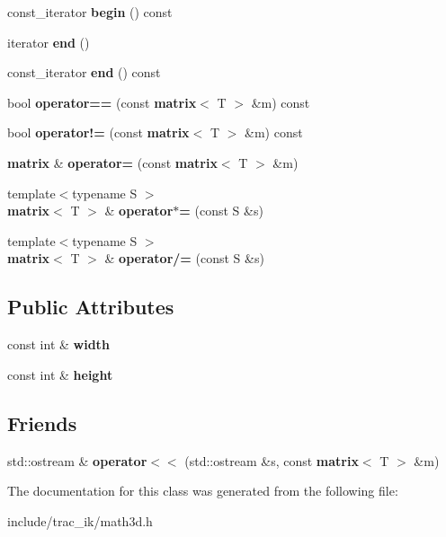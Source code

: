 \begin{DoxyCompactItemize}
\item 
const\-\_\-iterator {\bfseries begin} () const \label{classmath3d_1_1matrix_aa20581e4e4efc4295d15df554c97bb06}

\item 
iterator {\bfseries end} ()\label{classmath3d_1_1matrix_aabb29aaccf4c0b16e908f305b209b6f0}

\item 
const\-\_\-iterator {\bfseries end} () const \label{classmath3d_1_1matrix_a057711c247b5a18a2ffd91af551d828e}

\item 
bool {\bfseries operator==} (const {\bf matrix}$<$ T $>$ \&m) const \label{classmath3d_1_1matrix_a605f43dcbbef0ded4a428d73f0ed5215}

\item 
bool {\bfseries operator!=} (const {\bf matrix}$<$ T $>$ \&m) const \label{classmath3d_1_1matrix_a0a09de762f102c885c0617244816c44b}

\item 
{\bf matrix} \& {\bfseries operator=} (const {\bf matrix}$<$ T $>$ \&m)\label{classmath3d_1_1matrix_a8c7152a3e197c84727fa165ba27133c4}

\item 
{\footnotesize template$<$typename S $>$ }\\{\bf matrix}$<$ T $>$ \& {\bfseries operator$\ast$=} (const S \&s)\label{classmath3d_1_1matrix_a2df8ab5516ca15f6959bb570a7bd3403}

\item 
{\footnotesize template$<$typename S $>$ }\\{\bf matrix}$<$ T $>$ \& {\bfseries operator/=} (const S \&s)\label{classmath3d_1_1matrix_ad1e98ba8c12cf50a4dad71d7894a8e99}

\end{DoxyCompactItemize}
\subsection*{Public Attributes}
\begin{DoxyCompactItemize}
\item 
const int \& {\bfseries width}\label{classmath3d_1_1matrix_a643b9be5bd5f1edb02a552e2c3bf072e}

\item 
const int \& {\bfseries height}\label{classmath3d_1_1matrix_a4fb52bc202653062c85f81f80ec8d390}

\end{DoxyCompactItemize}
\subsection*{Friends}
\begin{DoxyCompactItemize}
\item 
std\-::ostream \& {\bfseries operator$<$$<$} (std\-::ostream \&s, const {\bf matrix}$<$ T $>$ \&m)\label{classmath3d_1_1matrix_a9970d6bd4e9147f83a89f77c35fd8fc6}

\end{DoxyCompactItemize}


The documentation for this class was generated from the following file\-:\begin{DoxyCompactItemize}
\item 
include/trac\-\_\-ik/math3d.\-h\end{DoxyCompactItemize}

